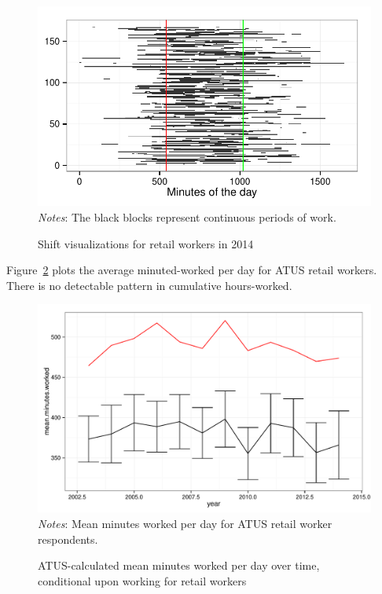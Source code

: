 \documentclass[11pt]{article}
\begin{document}
\begin{figure}[h]
\centering 
\caption{Shift visualizations for retail workers in 2014} \label{fig:shifts_2014}
\begin{minipage}{0.75 \linewidth}
\includegraphics[width = \linewidth]{./plots/scheduling_2014.pdf}
\\
\emph{Notes}: The black blocks represent continuous periods of work.  
\end{minipage} 
\end{figure}

Figure~\ref{fig:mean_minutes_worked} plots the average minuted-worked per day for ATUS retail workers.
There is no detectable pattern in cumulative hours-worked.

\begin{figure}[h]
\centering 
\caption{ATUS-calculated mean minutes worked per day over time, conditional upon working for retail workers}
\label{fig:mean_minutes_worked}
\begin{minipage}{0.75 \linewidth}
\includegraphics[width = \linewidth]{./plots/mean_minutes_worked.pdf}
\\
\emph{Notes}: Mean minutes worked per day for ATUS retail worker respondents. 
\end{minipage} 
\end{figure}
\end{document}
